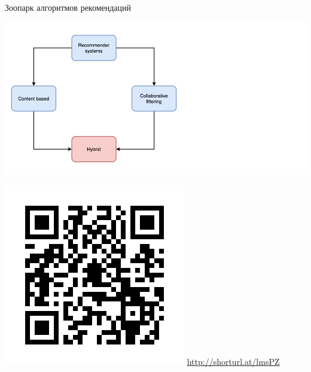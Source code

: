 \documentclass[11pt,aspectratio=169,handout]{beamer}
\begin{document}
\begin{frame}{Зоопарк алгоритмов рекомендаций \cite{ali_2021}}

\begin{center}
\includegraphics[scale=0.27]{images/taxonomy-4.png}
\end{center}

\includegraphics[scale=0.16]{images/poll.png} \hfill \url{http://shorturl.at/lmsPZ}

\end{frame}
\end{document}
